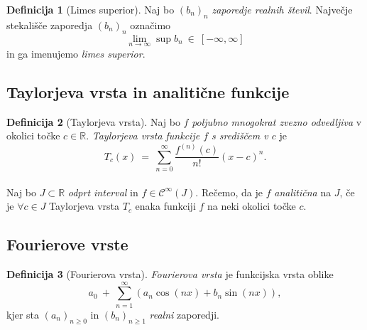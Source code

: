 \documentclass[11pt]{article}
\theoremstyle{definition}
\newtheorem{definicija}{Definicija}[section]
\theoremstyle{definition}
\theoremstyle{definition}
\theoremstyle{theorem}
\begin{document}
\begin{definicija}[Limes superior]

Naj bo $(b_n)_n$ \textit{zaporedje realnih števil}. Največje stekališče zaporedja $(b_n)_n$ označimo 
$$\lim_{n \rightarrow \infty} \sup b_n ~\in~ [-\infty, \infty]$$
in ga imenujemo \textit{limes superior}.

\end{definicija}
\vspace{0.5cm}


\subsection{Taylorjeva vrsta in analitične funkcije}
\vspace{0.5cm}

\begin{definicija}[Taylorjeva vrsta]

Naj bo $f$ \textit{poljubno mnogokrat zvezno odvedljiva} v okolici točke $c \in \mathbb{R}$. \textit{Taylorjeva vrsta funkcije $f$ s središčem v $c$} je 
$$T_c(x) ~=~ \sum_{n=0}^{\infty} \frac{f^{(n)}(c)}{n!} (x-c)^n.$$ \\

Naj bo $J \subset \mathbb{R}$ \textit{odprt interval} in $f \in \mathcal{C}^{\infty}(J)$. Rečemo, da je $f$ \textit{analitična} na $J$, če je $\forall c \in J$ Taylorjeva vrsta $T_c$ enaka funkciji $f$ na neki okolici točke $c$.

\end{definicija}
\vspace{0.5cm}


\subsection{Fourierove vrste}
\vspace{0.5cm}

\begin{definicija}[Fourierova vrsta]

\textit{Fourierova vrsta} je funkcijska vrsta oblike
$$a_0 ~+~ \sum_{n=1}^{\infty} (a_n \cos(nx) + b_n \sin(nx)),$$
kjer sta $(a_n)_{n \geq 0}$ in $(b_n)_{n \geq 1}$ \textit{realni} zaporedji.

\end{definicija}
\vspace{0.5cm}
\end{document}
